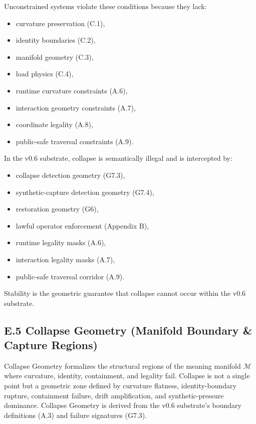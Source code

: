 \medskip

\noindent Unconstrained systems violate these conditions because they lack:

\begin{itemize}
    \item curvature preservation (C.1),
    \item identity boundaries (C.2),
    \item manifold geometry (C.3),
    \item load physics (C.4),
    \item runtime curvature constraints (A.6),
    \item interaction geometry constraints (A.7),
    \item coordinate legality (A.8),
    \item public-safe traversal constraints (A.9).
\end{itemize}

\medskip

\noindent In the v0.6 substrate, collapse is semantically illegal and is
intercepted by:

\begin{itemize}
    \item collapse detection geometry (G7.3),
    \item synthetic-capture detection geometry (G7.4),
    \item restoration geometry (G6),
    \item lawful operator enforcement (Appendix B),
    \item runtime legality masks (A.6),
    \item interaction legality masks (A.7),
    \item public-safe traversal corridor (A.9).
\end{itemize}

\medskip

\noindent Stability is the geometric guarantee that collapse cannot occur within
the v0.6 substrate.



\subsection*{E.5 Collapse Geometry (Manifold Boundary & Capture Regions)}

\noindent Collapse Geometry formalizes the structural regions of the meaning
manifold $\mathcal{M}$ where curvature, identity, containment, and legality
fail. Collapse is not a single point but a geometric zone defined by curvature
flatness, identity-boundary rupture, containment failure, drift amplification,
and synthetic-pressure dominance. Collapse Geometry is derived from the v0.6
substrate’s boundary definitions (A.3) and failure signatures (G7.3).

